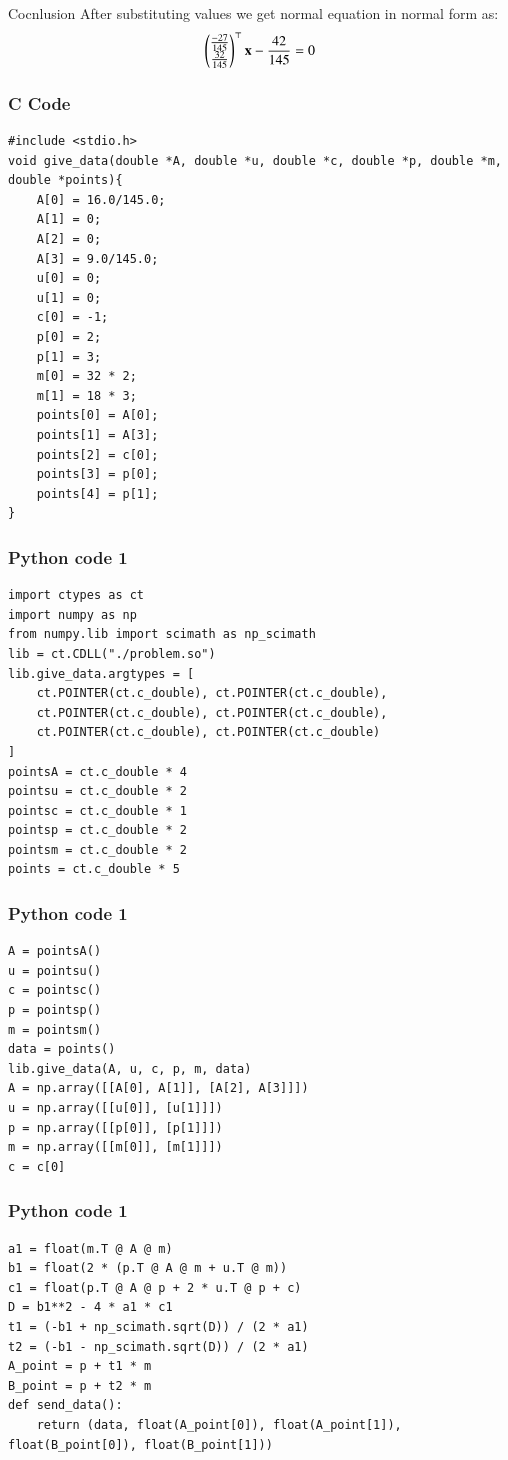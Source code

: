 \documentclass{beamer}
\begin{document}
\begin{frame}{Cocnlusion}
After substituting values we get normal equation in normal form as:
\begin{align}
    \begin{pmatrix}\frac{-27}{145}\\\frac{32}{145}\end{pmatrix}^\top\mathbf{x}-\frac{42}{145}=0
\end{align}
\end{frame}

\begin{frame}[fragile]
    \frametitle{C Code}
    \begin{lstlisting}
#include <stdio.h>
void give_data(double *A, double *u, double *c, double *p, double *m, double *points){
    A[0] = 16.0/145.0; 
    A[1] = 0; 
    A[2] = 0; 
    A[3] = 9.0/145.0;  
    u[0] = 0; 
    u[1] = 0;
    c[0] = -1;   
    p[0] = 2; 
    p[1] = 3;
    m[0] = 32 * 2;
    m[1] = 18 * 3; 
    points[0] = A[0];
    points[1] = A[3];
    points[2] = c[0];
    points[3] = p[0];
    points[4] = p[1];
}
    \end{lstlisting}
\end{frame}

\begin{frame}[fragile]
    \frametitle{Python code 1}
    \begin{lstlisting}
import ctypes as ct
import numpy as np
from numpy.lib import scimath as np_scimath
lib = ct.CDLL("./problem.so")
lib.give_data.argtypes = [
    ct.POINTER(ct.c_double), ct.POINTER(ct.c_double),
    ct.POINTER(ct.c_double), ct.POINTER(ct.c_double),
    ct.POINTER(ct.c_double), ct.POINTER(ct.c_double)
]
pointsA = ct.c_double * 4
pointsu = ct.c_double * 2
pointsc = ct.c_double * 1
pointsp = ct.c_double * 2
pointsm = ct.c_double * 2
points = ct.c_double * 5
    \end{lstlisting}
\end{frame}

\begin{frame}[fragile]
    \frametitle{Python code 1}
    \begin{lstlisting}
A = pointsA()
u = pointsu()
c = pointsc()
p = pointsp()
m = pointsm()
data = points()
lib.give_data(A, u, c, p, m, data)
A = np.array([[A[0], A[1]], [A[2], A[3]]])
u = np.array([[u[0]], [u[1]]])
p = np.array([[p[0]], [p[1]]])
m = np.array([[m[0]], [m[1]]])
c = c[0]
    \end{lstlisting}
\end{frame}

\begin{frame}[fragile]
    \frametitle{Python code 1}
    \begin{lstlisting}
a1 = float(m.T @ A @ m)
b1 = float(2 * (p.T @ A @ m + u.T @ m))
c1 = float(p.T @ A @ p + 2 * u.T @ p + c)
D = b1**2 - 4 * a1 * c1
t1 = (-b1 + np_scimath.sqrt(D)) / (2 * a1)
t2 = (-b1 - np_scimath.sqrt(D)) / (2 * a1)
A_point = p + t1 * m
B_point = p + t2 * m
def send_data():
    return (data, float(A_point[0]), float(A_point[1]), float(B_point[0]), float(B_point[1]))
    \end{lstlisting}
\end{frame}
\end{document}
